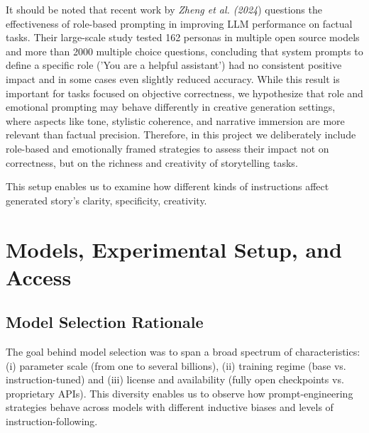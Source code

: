\documentclass[12pt]{article}
\begin{document}
It should be noted that recent work by \textit{Zheng et al. (2024}) questions the effectiveness of role-based prompting in improving LLM performance on factual tasks. Their large-scale study tested 162 personas in multiple open source models and more than 2000 multiple choice questions, concluding that system prompts to define a specific role ('You are a helpful assistant') had no consistent positive impact and in some cases even slightly reduced accuracy. While this result is important for tasks focused on objective correctness, we hypothesize that role and emotional prompting may behave differently in creative generation settings, where aspects like tone, stylistic coherence, and narrative immersion are more relevant than factual precision. Therefore, in this project we deliberately include role-based and emotionally framed strategies to assess their impact not on correctness, but on the richness and creativity of storytelling tasks.

This setup enables us to examine how different kinds of instructions affect generated story’s clarity, specificity, creativity.


\newpage

\section{Models, Experimental Setup, and Access}

\subsection{Model Selection Rationale}
The goal behind model selection was to span a broad spectrum of characteristics: (i) parameter scale (from one to several billions), (ii) training regime (base vs. instruction-tuned) and (iii) license and availability (fully open checkpoints vs. proprietary APIs). This diversity enables us to observe how prompt-engineering strategies behave across models with different inductive biases and levels of instruction-following.
\end{document}
